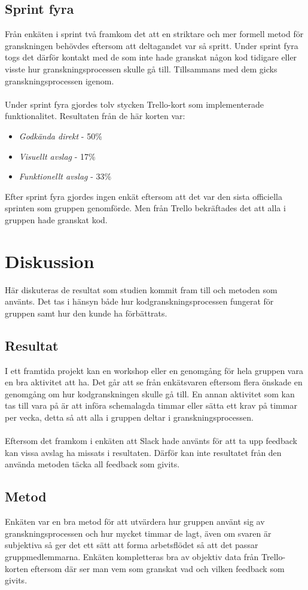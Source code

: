 \subsection{Sprint fyra}
Från enkäten i sprint två framkom det att en striktare och mer formell metod för granskningen behövdes eftersom att deltagandet var så spritt. Under sprint fyra togs det därför kontakt med de som inte hade granskat någon kod tidigare eller visste hur granskningsprocessen skulle gå till. Tillsammans med dem gicks granskningsprocessen igenom. 
\\ \\
Under sprint fyra gjordes tolv stycken Trello-kort som implementerade funktionalitet. Resultaten från de här korten var:
\begin{itemize}
\item \textit{Godkända direkt} -  50\%
\item \textit{Visuellt avslag} - 17\%
\item \textit{Funktionellt avslag} - 33\%
\end{itemize}
Efter sprint fyra gjordes ingen enkät eftersom att det var den sista officiella sprinten som gruppen genomförde. Men från Trello bekräftades det att alla i gruppen hade granskat kod.

\section{Diskussion}
\label{sec:victor-discussion}
Här diskuteras de resultat som studien kommit fram till och metoden som använts. Det tas i hänsyn både hur kodgranskningsprocessen fungerat för gruppen samt hur den kunde ha förbättrats.
\subsection{Resultat}
I ett framtida projekt kan en workshop eller en genomgång för hela gruppen vara en bra aktivitet att ha. Det går att se från enkätsvaren eftersom flera önskade en genomgång om hur kodgranskningen skulle gå till. En annan aktivitet som kan tas till vara på är att införa schemalagda timmar eller sätta ett krav på timmar per vecka, detta så att alla i gruppen deltar i granskningsprocessen.
\\ \\
Eftersom det framkom i enkäten att Slack hade använts för att ta upp feedback kan vissa avslag ha missats i resultaten. Därför kan inte resultatet från den använda metoden täcka all feedback som givits.
\subsection{Metod}
Enkäten var en bra metod för att utvärdera hur gruppen använt sig av granskningsprocessen och hur mycket timmar de lagt, även om svaren är subjektiva så ger det ett sätt att forma arbetsflödet så att det passar gruppmedlemmarna. Enkäten kompletteras bra av objektiv data från Trello-korten eftersom där ser man vem som granskat vad och vilken feedback som givits.
